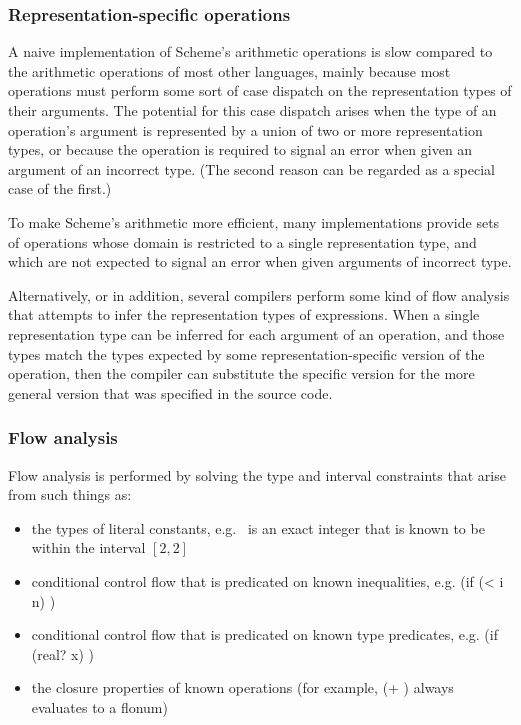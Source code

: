 \documentclass[twoside,twocolumn]{algol60}
\begin{document}
\subsubsection{Representation-specific operations}

A naive implementation of Scheme's arithmetic operations is slow
compared to the arithmetic operations of most other languages, mainly
because most operations must perform some sort of case dispatch on the
representation types of their arguments.  The potential for this case
dispatch arises when the type of an operation's argument is
represented by a union of two or more representation types, or because
the operation is required to signal an error when given an argument of
an incorrect type.  (The second reason can be regarded as a special
case of the first.)

To make Scheme's arithmetic more efficient, many implementations
provide sets of operations whose domain is restricted to a single
representation type, and which are not expected to signal an error
when given arguments of incorrect type.

Alternatively, or in addition, several compilers perform some kind of
flow analysis that attempts to infer the representation types of
expressions.  When a single representation type can be inferred for
each argument of an operation, and those types match the types
expected by some representation-specific version of the operation,
then the compiler can substitute the specific version for the more
general version that was specified in the source code.

\subsubsection{Flow analysis}

Flow analysis is performed by solving the type and interval
constraints that arise from such things as:

\begin{itemize}
\item the types of literal constants, e.g.\ {} is an exact integer
  that is known to be within the interval $[2,2]$
  
\item conditional control flow that is predicated on known
  inequalities, e.g. {\cf (if (< i n)  )}
  
\item conditional control flow that is predicated on known type
  predicates, e.g. {\cf (if (real? x)  )}
  
\item the closure properties of known operations (for example, {\cf (+
     )} always evaluates to a flonum)
\end{itemize}
  
\end{document}

